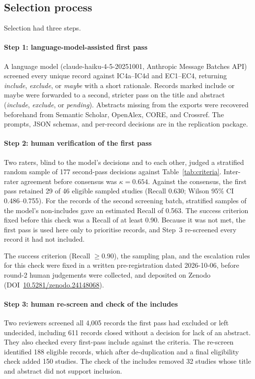 \documentclass[preprint,12pt,authoryear=false]{elsarticle}
\begin{document}
\subsection{Selection process}\label{sec:selection-process}

Selection had three steps.

\paragraph{Step 1: language-model-assisted first pass}
A language model (claude-haiku-4-5-20251001, Anthropic Message Batches API) screened every unique record against IC4a--IC4d and EC1--EC4, returning \emph{include}, \emph{exclude}, or \emph{maybe} with a short rationale. Records marked include or maybe were forwarded to a second, stricter pass on the title and abstract (\emph{include}, \emph{exclude}, or \emph{pending}). Abstracts missing from the exports were recovered beforehand from Semantic Scholar, OpenAlex, CORE, and Crossref. The prompts, JSON schemas, and per-record decisions are in the replication package.

\paragraph{Step 2: human verification of the first pass}
Two raters, blind to the model's decisions and to each other, judged a stratified random sample of 177 second-pass decisions against Table~\ref{tab:criteria}. Inter-rater agreement before consensus was $\kappa = 0.654$. Against the consensus, the first pass retained 29 of 46 eligible sampled studies (Recall 0.630; Wilson 95\% CI 0.486--0.755). For the records of the second screening batch, stratified samples of the model's non-includes gave an estimated Recall of 0.563. The success criterion fixed before this check was a Recall of at least 0.90. Because it was not met, the first pass is used here only to prioritise records, and Step~3 re-screened every record it had not included.

The success criterion (Recall $\geq 0.90$), the sampling plan, and the escalation rules for this check were fixed in a written pre-registration dated 2026-10-06, before round-2 human judgements were collected, and deposited on Zenodo (DOI~\href{https://doi.org/10.5281/zenodo.24148068}{10.5281/zenodo.24148068}).

\paragraph{Step 3: human re-screen and check of the includes}
Two reviewers screened all 4,005 records the first pass had excluded or left undecided, including 611 records closed without a decision for lack of an abstract. They also checked every first-pass include against the criteria. The re-screen identified 188 eligible records, which after de-duplication and a final eligibility check added 150 studies. The check of the includes removed 32 studies whose title and abstract did not support inclusion.
\end{document}
